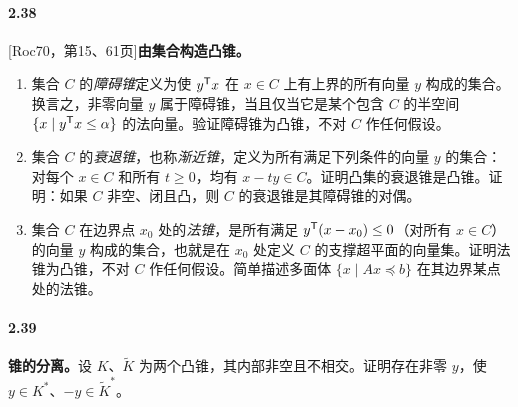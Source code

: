 \paragraph{2.38}
[Roc70，第15、61页]\quad\textbf{由集合构造凸锥。}
\begin{enumerate}[label=(\alph*)]
\item 集合 $C$ 的\emph{障碍锥}定义为使 $y^{\mathsf T}x$ 在 $x\in C$ 上有上界的所有向量 $y$ 构成的集合。换言之，非零向量 $y$ 属于障碍锥，当且仅当它是某个包含 $C$ 的半空间 $\{x\mid y^{\mathsf T}x\le\alpha\}$ 的法向量。验证障碍锥为凸锥，不对 $C$ 作任何假设。
\item 集合 $C$ 的\emph{衰退锥}，也称\emph{渐近锥}，定义为所有满足下列条件的向量 $y$ 的集合：对每个 $x\in C$ 和所有 $t\ge0$，均有 $x-ty\in C$。证明凸集的衰退锥是凸锥。证明：如果 $C$ 非空、闭且凸，则 $C$ 的衰退锥是其障碍锥的对偶。
\item 集合 $C$ 在边界点 $x_0$ 处的\emph{法锥}，是所有满足 $y^{\mathsf T}(x-x_0)\le0$（对所有 $x\in C$）的向量 $y$ 构成的集合，也就是在 $x_0$ 处定义 $C$ 的支撑超平面的向量集。证明法锥为凸锥，不对 $C$ 作任何假设。简单描述多面体 $\{x\mid Ax\preceq b\}$ 在其边界某点处的法锥。
\end{enumerate}

\paragraph{2.39}
\textbf{锥的分离。}设 $K$、$\widetilde K$ 为两个凸锥，其内部非空且不相交。证明存在非零 $y$，使 $y\in K^*$、$-y\in\widetilde K^*$。

